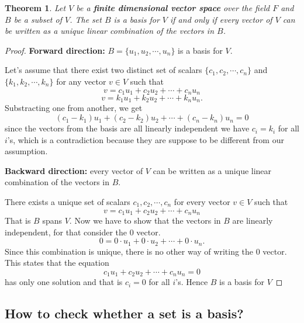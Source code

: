 \documentclass[a4paper, titlepage]{article}
\newtheorem{theorem}{Theorem}[section]
\begin{document}
        \begin{theorem}
            Let $V$ be a \textbf{finite dimensional vector space} over 
            the field $F$ and $B$ be a subset of $V$. The set $B$ is a
            basis for $V$ if and only if every vector of $V$ can be written
            as a unique linear combination of the vectors in $B$.
        \end{theorem}
        \begin{proof}
            \textbf{Forward direction: }$B = \{ u_1, u_2, \cdots, 
            u_n \}$ is a basis for $V$.

            \noindent Let's assume that there exist two distinct set of scalars
            $\{ c_1, c_2, \cdots, c_n \}$ and $\{ k_1, k_2, \cdots, k_n \}$ 
            for any vector $v \in V$ such that
            $$ v = c_1u_1 + c_2u_2 + \cdots + c_nu_n $$
            $$ v = k_1u_1 + k_2u_2 + \cdots + k_nu_n .$$
            Substracting one from another, we get
            $$ (c_1-k_1)u_1 + (c_2-k_2)u_2 + \cdots + (c_n-k_n)u_n = 0$$ 
            since the vectors from the basis are all linearly 
            independent we have $c_i = k_i$ for all $i$'s, which is a 
            contradiction because they are suppose to be different 
            from our assumption.
            
            \noindent\textbf{Backward direction: }every vector of 
            $V$ can be written as a unique linear combination of 
            the vectors in $B$.
            
            \noindent There exists a unique set of scalars 
            $c_1, c_2, \cdots, c_n$ for every vector $v \in V$ 
            such that $$ v = c_1u_1 + c_2u_2 + \cdots + c_nu_n $$
            That is $B$ spans $V$. Now we have to show that the 
            vectors in $B$ are linearly independent, for that consider
            the $0$ vector. $$ 0 = 0\cdot u_1 + 0\cdot u_2 + \cdots + 0\cdot u_n. $$
            Since this combination is unique, there is no other way
            of writing the $0$ vector. This states that the equation
            $$ c_1u_1 + c_2u_2 + \cdots + c_nu_n = 0 $$ has only one
            solution and that is $c_i = 0$ for all $i$'s. Hence $B$ is
            a basis for $V$

        \end{proof}

    \subsection{How to check whether a set is a basis?}
    
\end{document}
